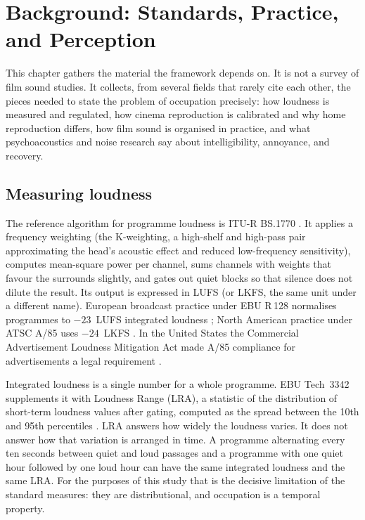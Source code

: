 \chapter{Background: Standards, Practice, and Perception}
\label{ch:background}

This chapter gathers the material the framework depends on. It is not a survey of film sound studies. It collects, from several fields that rarely cite each other, the pieces needed to state the problem of occupation precisely: how loudness is measured and regulated, how cinema reproduction is calibrated and why home reproduction differs, how film sound is organised in practice, and what psychoacoustics and noise research say about intelligibility, annoyance, and recovery.

\section{Measuring loudness}

The reference algorithm for programme loudness is ITU-R BS.1770 \citep{itu1770}. It applies a frequency weighting (the K-weighting, a high-shelf and high-pass pair approximating the head's acoustic effect and reduced low-frequency sensitivity), computes mean-square power per channel, sums channels with weights that favour the surrounds slightly, and gates out quiet blocks so that silence does not dilute the result. Its output is expressed in LUFS (or LKFS, the same unit under a different name). European broadcast practice under EBU R\,128 normalises programmes to $-23$~LUFS integrated loudness \citep{ebu128}; North American practice under ATSC A/85 uses $-24$~LKFS \citep{atsc85}. In the United States the Commercial Advertisement Loudness Mitigation Act made A/85 compliance for advertisements a legal requirement \citep{calm2010}.

Integrated loudness is a single number for a whole programme. EBU Tech~3342 supplements it with Loudness Range (LRA), a statistic of the distribution of short-term loudness values after gating, computed as the spread between the 10th and 95th percentiles \citep{ebu3342}. LRA answers how widely the loudness varies. It does not answer how that variation is arranged in time. A programme alternating every ten seconds between quiet and loud passages and a programme with one quiet hour followed by one loud hour can have the same integrated loudness and the same LRA. For the purposes of this study that is the decisive limitation of the standard measures: they are distributional, and occupation is a temporal property.

